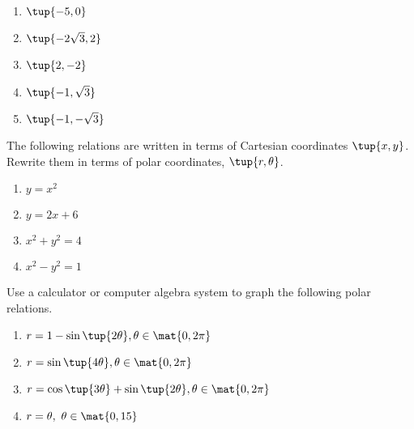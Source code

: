 \begin{enumialphparenastyle}
\begin{ex}
\begin{enumerate}
\item $\tup{-5,0} $

\item $\tup{-2\sqrt{3},2} $

\item $\tup{2,-2} $

\item $\tup{-1,\sqrt{3}} $

\item $\tup{-1,-\sqrt{3}} $
\end{enumerate}
\end{ex}

\begin{ex} The following relations are written in terms of Cartesian coordinates $\tup{x, y }$. Rewrite them in terms of polar coordinates, $\tup{r, \theta }$. 

\begin{enumerate}
\item $y=x^{2}$

\item $y=2x+6$

\item $x^{2}+y^{2}=4$

\item $x^{2}-y^{2}=1$
\end{enumerate}
\end{ex}

\begin{ex} Use a calculator or computer algebra system to graph the following
polar relations.

\begin{enumerate}
\item $r=1-\sin \tup{2\theta } ,\theta \in \mat{0,2\pi} $

\item $r=\sin \tup{4\theta } ,\theta \in \mat{0,2\pi} $ 

\item $r=\cos \tup{3\theta } +\sin \tup{2\theta } ,\theta
\in \mat{0,2\pi} $

\item $r=\theta ,\ \theta \in \mat{0,15} $
\end{enumerate}
\end{ex}


\end{enumialphparenastyle}

